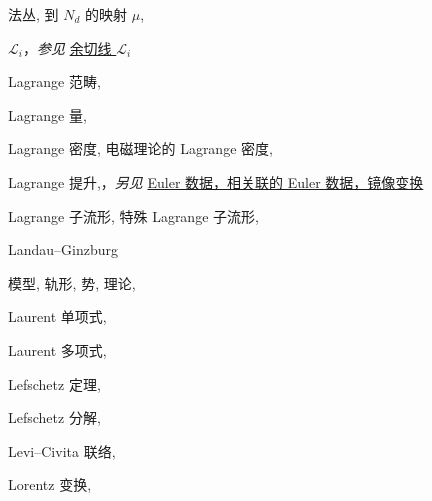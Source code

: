 \begin{theindex}
\subsubitem \leavevmode\hypertarget{idx:0707}{法丛},\enspace{}
\subitem \leavevmode\hypertarget{idx:0708}{到 $N_d$ 的映射 $\mu$},\enspace{}
\indexspace
\item \leavevmode\hypertarget{idx:0715}{$\mathcal L_i$}，\textit{参见} \hyperlink{idx:0198}{余切线 $\mathcal L_i$}
\indexspace
\item \leavevmode\hypertarget{idx:0686}{Lagrange 范畴},\enspace{}
\indexspace
\item \leavevmode\hypertarget{idx:0685}{Lagrange 量},\enspace{}
\indexspace
\item \leavevmode\hypertarget{idx:0687}{Lagrange 密度},\enspace{}
\subitem \leavevmode\hypertarget{idx:0688}{电磁理论的 Lagrange 密度},\enspace{}
\indexspace
\item \leavevmode\hypertarget{idx:0684}{Lagrange 提升},\enspace{}，\textit{另见} \hyperlink{idx:0268}{Euler 数据，相关联的 Euler 数据，镜像变换}
\indexspace
\item \leavevmode\hypertarget{idx:0689}{Lagrange 子流形},\enspace{}
\subitem \leavevmode\hypertarget{idx:0690}{特殊 Lagrange 子流形},\enspace{}
\indexspace
\item \leavevmode\hypertarget{idx:0691}{Landau--Ginzburg}
\subitem \leavevmode\hypertarget{idx:0692}{模型},\enspace{}
\subitem \leavevmode\hypertarget{idx:0693}{轨形},\enspace{}
\subitem \leavevmode\hypertarget{idx:0694}{势},\enspace{}
\subitem \leavevmode\hypertarget{idx:0695}{理论},\enspace{}
\indexspace
\item \leavevmode\hypertarget{idx:0703}{Laurent 单项式},\enspace{}
\indexspace
\item \leavevmode\hypertarget{idx:0704}{Laurent 多项式},\enspace{}
\indexspace
\item \leavevmode\hypertarget{idx:0710}{Lefschetz 定理},\enspace{}
\indexspace
\item \leavevmode\hypertarget{idx:0709}{Lefschetz 分解},\enspace{}
\indexspace
\item \leavevmode\hypertarget{idx:0714}{Levi--Civita 联络},\enspace{}
\indexspace
\item \leavevmode\hypertarget{idx:0744}{Lorentz 变换},\enspace{}

\end{theindex}
